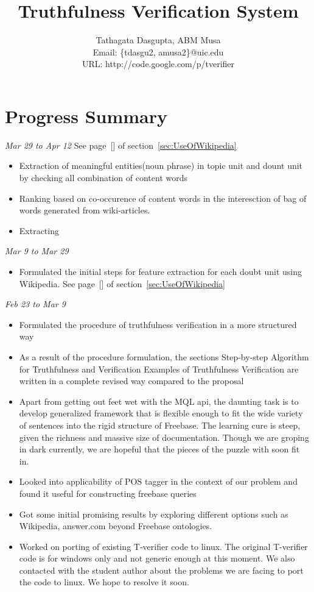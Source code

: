 \documentclass[11pt]{article}
\begin{document}
\title{Truthfulness Verification System}

\author{
Tathagata Dasgupta, ABM Musa\\
Email: \{tdasgu2, amusa2\}@uic.edu\\
URL: http://code.google.com/p/tverifier }

\date{}
\maketitle


\section{Progress Summary}


{\em Mar 29 to Apr 12}
See page~[\pageref{Mar29toApr12}] of section~\ref{sec:UseOfWikipedia}
\begin{itemize}
\item Extraction of meaningful entities(noun phrase) in topic unit and dount unit by checking all combination of content words
\item Ranking based on co-occurence of content words in the interesction of bag of words generated from wiki-articles. 
\item Extracting 
\end{itemize}


{\em Mar 9 to Mar 29}
\begin{itemize}
\item Formulated the initial steps for feature extraction for each doubt unit using Wikipedia. See page~[\pageref{March9to29}] of section~\ref{sec:UseOfWikipedia}
\end{itemize} 
{\em Feb 23 to Mar 9} 
\begin{itemize}
\item Formulated the procedure of truthfulness verification in a more structured way
\item As a result of the procedure formulation, the sections Step-by-step Algorithm for Truthfulness and Verification Examples of Truthfulness Verification are written in a complete revised way compared to the proposal
\item Apart from getting out feet wet with the MQL api, the daunting task is to develop generalized framework that is flexible enough to fit the wide variety of sentences into the rigid structure of Freebase. The learning cure is steep, given the richness and massive size of documentation. Though we are groping in dark currently, we are hopeful that the pieces of the puzzle with soon fit in.
\item Looked into applicability of POS tagger in the context of our problem and found it useful for constructing freebase queries
\item Got some initial promising results by exploring different options such as Wikipedia, answer.com beyond Freebase ontologies. 
\item Worked on porting of existing T-verifier code to linux. The original T-verifier code is for windows only and not generic enough at this moment. We also contacted with the student author about the problems we are facing to port the code to linux. We hope to resolve it soon.
\end{itemize}
\end{document}
